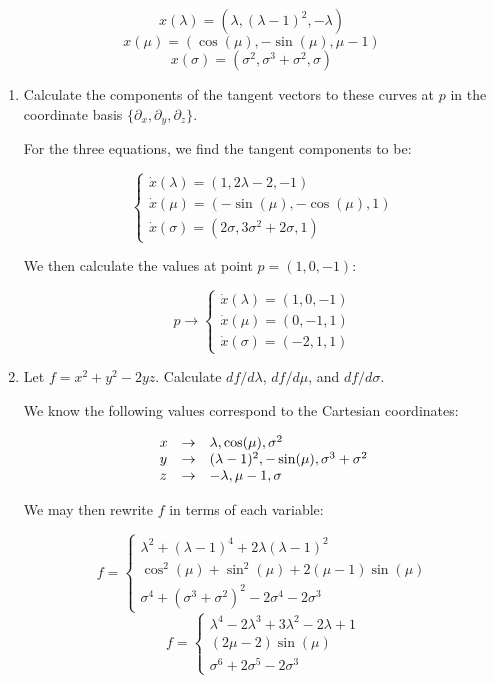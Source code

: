 \begin{enumerate}
    $$x(\lambda)=(\lambda, (\lambda-1)^2,-\lambda)$$
    $$x(\mu)=(\cos(\mu),-\sin(\mu),\mu-1)$$
    $$x(\sigma)=(\sigma^2, \sigma^3+\sigma^2,\sigma)$$

    \begin{enumerate}

      \item Calculate the components of the tangent vectors to these curves at $p$ in the coordinate basis $\{\partial_x, \partial_y, \partial_z \}$.

        For the three equations, we find the tangent components to be:

        $$\left\{\begin{array}{l} \dot{x}(\lambda)=(1,2\lambda-2,-1)\\\dot{x}(\mu)=(-\sin(\mu),-\cos(\mu),1)\\\dot{x}(\sigma)=(2\sigma,3\sigma^2+2\sigma,1)\end{array}$$

          We then calculate the values at point $p=(1,0,-1)$:

          $$p\to\left\{\begin{array}{l} \dot{x}(\lambda)=(1,0,-1)\\\dot{x}(\mu)=(0,-1,1)\\\dot{x}(\sigma)=(-2,1,1)\end{array}$$

      \item Let $f=x^2+y^2-2yz$. Calculate $df/d\lambda$, $df/d\mu$, and $df/d\sigma$.

        We know the following values correspond to the Cartesian coordinates:

        $$\begin{array}{l l l} x & \to & \lambda, \cos(\mu), \sigma^2\\ y & \to & (\lambda-1)^2,-\sin(\mu),\sigma^3+\sigma^2\\ z & \to & -\lambda,\mu-1,\sigma \end{array}$$

        We may then rewrite $f$ in terms of each variable:

        $$f=\left\{\begin{array}{l} \lambda^2+(\lambda-1)^4+2\lambda(\lambda-1)^2\\ \cos^2(\mu)+\sin^2(\mu)+2(\mu-1)\sin(\mu)\\\sigma^4+(\sigma^3+\sigma^2)^2-2\sigma^4-2\sigma^3\end{array}$$
        $$f=\left\{\begin{array}{l} \lambda^4-2\lambda^3+3\lambda^2-2\lambda+1\\ (2\mu-2)\sin(\mu)\\\sigma^6+2\sigma^5-2\sigma^3\end{array}$$


\end{enumerate}
\end{enumerate}
